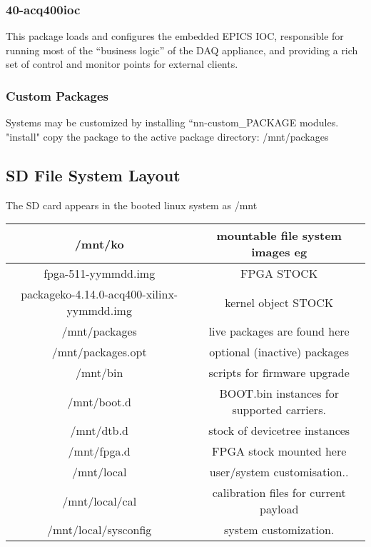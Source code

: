 \documentclass[]{article}
\begin{document}
\subsubsection{40-acq400ioc}
This package loads and configures the embedded EPICS IOC, responsible for running most of the “business logic” of the DAQ appliance, and providing a rich set of control and monitor points for external clients.

\subsubsection{Custom Packages}
Systems may be customized by installing “nn-custom_PACKAGE modules.
"install" copy the package to the active package directory: /mnt/packages

\subsection{SD File System Layout}
The SD card appears in the booted linux system as /mnt

\begin{tabular}{|c|c|}
\hline 
/mnt/ko & mountable file system images eg  \\ 
\hline 
fpga-511-yymmdd.img & FPGA STOCK \\ 
\hline 
packageko-4.14.0-acq400-xilinx-yymmdd.img & kernel object STOCK \\ 
\hline 
/mnt/packages & live packages are found here \\ 
\hline 
/mnt/packages.opt & optional (inactive) packages \\ 
\hline 
/mnt/bin & scripts for firmware upgrade \\ 
\hline 
/mnt/boot.d & BOOT.bin instances for supported carriers. \\ 
\hline 
/mnt/dtb.d & stock of devicetree instances \\ 
\hline 
/mnt/fpga.d & FPGA stock mounted here \\ 
\hline 
/mnt/local   & user/system customisation.. \\
\hline 
/mnt/local/cal    & calibration files for current payload \\
\hline 
/mnt/local/sysconfig  &  system customization. \\
\hline 
\end{tabular} 
\end{document}
